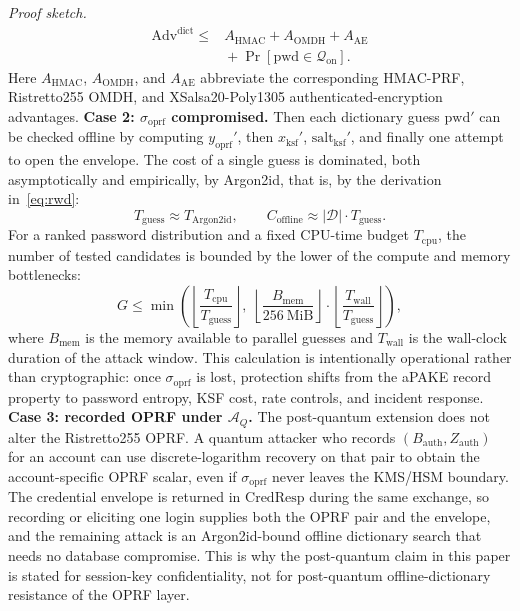 \documentclass{ieeeijc}
\newcommand{\sigoprf}{\sigma_{\mathrm{oprf}}}
\theoremstyle{remark}
\newenvironment{sketchproof}{\par\noindent\textit{Proof sketch.}\ }{\par}
\begin{document}
\begin{sketchproof}
\[\begin{aligned}
    \mathrm{Adv}^{\mathrm{dict}} \leq{}&
      A_{\mathrm{HMAC}} + A_{\mathrm{OMDH}} + A_{\mathrm{AE}}\\
      &{}+ \Pr[\mathrm{pwd} \in \mathcal{Q}_{\mathrm{on}}].
  \end{aligned}
\]
Here $A_{\mathrm{HMAC}}$, $A_{\mathrm{OMDH}}$, and $A_{\mathrm{AE}}$
abbreviate the corresponding HMAC-PRF, Ristretto255 OMDH, and
XSalsa20-Poly1305 authenticated-encryption advantages.
\textbf{Case 2: \textnormal{$\sigoprf$ compromised.}} Then
each dictionary guess $\mathrm{pwd}'$ can be checked offline by
computing $y_{\mathrm{oprf}}'$, then
$x_{\mathrm{ksf}}'$, $\mathrm{salt}_{\mathrm{ksf}}'$, and finally one
attempt to open the envelope. The cost of a single guess is dominated,
both asymptotically and empirically, by Argon2id, that is, by the
derivation in~\eqref{eq:rwd}:
\[
  T_{\mathrm{guess}} \approx T_{\mathrm{Argon2id}},\qquad
  C_{\mathrm{offline}} \approx |\mathcal{D}| \cdot T_{\mathrm{guess}}.
\]
For a ranked password distribution and a fixed CPU-time budget
$T_{\mathrm{cpu}}$, the
number of tested candidates is bounded by the lower of the compute and
memory bottlenecks:
\[
  G \leq
  \min\!\left(
    \left\lfloor \frac{T_{\mathrm{cpu}}}{T_{\mathrm{guess}}} \right\rfloor,\;
    \left\lfloor \frac{B_{\mathrm{mem}}}{256~\mathrm{MiB}} \right\rfloor
      \cdot
      \left\lfloor \frac{T_{\mathrm{wall}}}{T_{\mathrm{guess}}} \right\rfloor
  \right),
\]
where $B_{\mathrm{mem}}$ is the memory available to parallel guesses and
$T_{\mathrm{wall}}$ is the wall-clock duration of the attack
window. This calculation is intentionally operational rather than
cryptographic: once $\sigoprf$ is lost, protection shifts from the
aPAKE record property to password entropy, KSF cost, rate controls, and
incident response.
\textbf{Case 3: \textnormal{recorded OPRF under $\mathcal{A}_Q$.}}
The post-quantum extension does not alter the Ristretto255 OPRF. A quantum
attacker who records $(B_{\mathrm{auth}}, Z_{\mathrm{auth}})$ for an account
can use discrete-logarithm recovery on that pair to obtain the
account-specific OPRF scalar, even if $\sigoprf$ never leaves the KMS/HSM
boundary. The credential envelope is returned in $\mathrm{CredResp}$ during the
same exchange, so recording or eliciting one login supplies both the OPRF pair
and the envelope, and the remaining attack is an Argon2id-bound offline
dictionary search that needs no database compromise. This is why the
post-quantum claim in this paper is stated for session-key confidentiality,
not for post-quantum offline-dictionary resistance of the OPRF layer.
\end{sketchproof}
\end{document}
